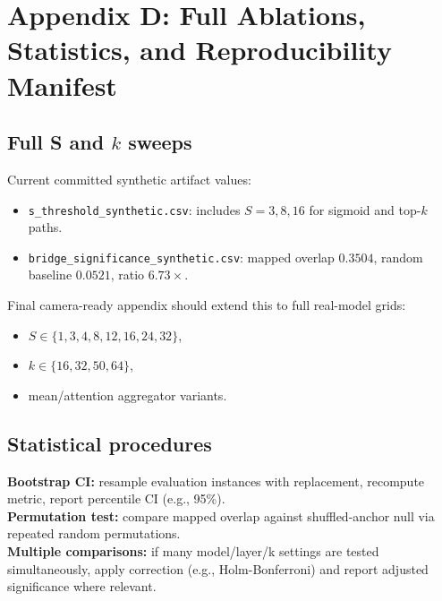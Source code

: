 \documentclass{article}
\begin{document}
\section{Appendix D: Full Ablations, Statistics, and Reproducibility Manifest}
\subsection{Full S and $k$ sweeps}
Current committed synthetic artifact values:
\begin{itemize}
\item \texttt{s\_threshold\_synthetic.csv}: includes $S=3,8,16$ for sigmoid and top-$k$ paths.
\item \texttt{bridge\_significance\_synthetic.csv}: mapped overlap $0.3504$, random baseline $0.0521$, ratio $6.73\times$.
\end{itemize}
Final camera-ready appendix should extend this to full real-model grids:
\begin{itemize}
\item $S\in\{1,3,4,8,12,16,24,32\}$,
\item $k\in\{16,32,50,64\}$,
\item mean/attention aggregator variants.
\end{itemize}
\subsection{Statistical procedures}
\textbf{Bootstrap CI:} resample evaluation instances with replacement, recompute metric, report percentile CI (e.g., 95\%).\\
\textbf{Permutation test:} compare mapped overlap against shuffled-anchor null via repeated random permutations.\\
\textbf{Multiple comparisons:} if many model/layer/k settings are tested simultaneously, apply correction (e.g., Holm-Bonferroni) and report adjusted significance where relevant.
\end{document}

